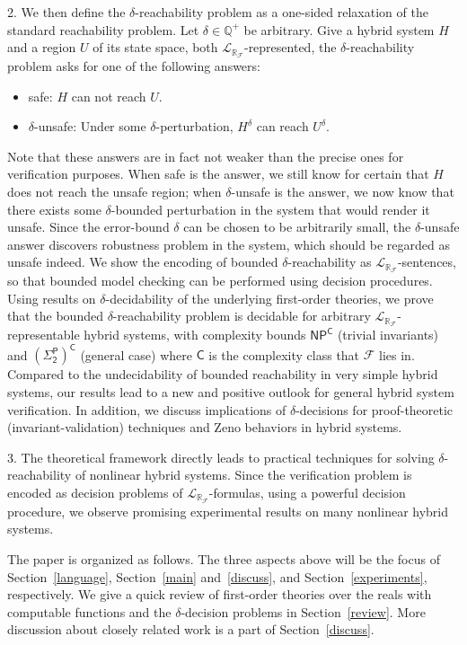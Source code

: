 \documentclass[envcountsect]{llncs}
\newcommand{\lrf}{\mathcal{L}_{\mathbb{R}_{\mathcal{F}}}}
\begin{document}
2. We then define the $\delta$-reachability problem as a one-sided
relaxation of the standard reachability problem. Let $\delta\in \mathbb{Q}^+$ be
arbitrary. Give a hybrid system $H$ and a region $U$ of its state
space, both $\lrf$-represented, the $\delta$-reachability problem asks for
one of the following answers:
\begin{itemize}
 \item {\sf safe}: $H$ can not reach $U$.
 \item {\sf $\delta$-unsafe}: Under some $\delta$-perturbation, $H^{\delta}$ can
reach $U^{\delta}$. 
\end{itemize}
Note that these answers are in fact not weaker than the precise ones for
verification purposes. When {\sf safe} is the answer, we still know for certain
that $H$ does not reach the unsafe region; when {\sf $\delta$-unsafe} is the
answer, we now know that there exists some $\delta$-bounded perturbation in the
system that would render it unsafe. Since the error-bound $\delta$ can be chosen
to be arbitrarily small, the $\delta$-unsafe answer discovers robustness problem
in the system, which should be regarded as unsafe indeed. We show the encoding
 of bounded $\delta$-reachability as $\lrf$-sentences, so that bounded model
checking can be performed using decision procedures. Using results on
$\delta$-decidability of the underlying first-order theories, we prove that the
bounded $\delta$-reachability problem is decidable for arbitrary
$\lrf$-representable hybrid systems, with complexity bounds $\mathsf{NP^C}$
(trivial invariants) and $\mathsf{(\Sigma_2^P)^C}$ (general case) where
$\mathsf{C}$ is the complexity class that $\mathcal{F}$ lies in. Compared to the
undecidability of bounded reachability in very simple hybrid systems, our
results lead to a new and positive outlook for general hybrid system
verification. In addition, we discuss implications of $\delta$-decisions
for proof-theoretic (invariant-validation) techniques and Zeno
behaviors in hybrid systems.  

3. The theoretical framework directly leads to practical techniques for solving
$\delta$-reachability of nonlinear hybrid systems. Since the verification
problem is encoded as decision problems of $\lrf$-formulas, using a
powerful decision procedure, we observe promising experimental results on many
nonlinear hybrid systems. 

The paper is organized as follows. The three aspects above will be the focus
of Section~\ref{language}, Section~\ref{main} and~\ref{discuss}, and
Section~\ref{experiments}, respectively. We give a quick review of
first-order theories over the reals with computable functions and the 
$\delta$-decision problems in Section~\ref{review}. More discussion about
closely related work is a part of Section~\ref{discuss}. 
\end{document}
